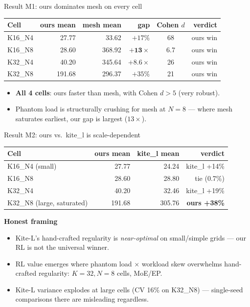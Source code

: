 \documentclass[aspectratio=169]{beamer}
\begin{document}
\begin{frame}{Result M1: ours dominates mesh on every cell}
\centering\small
\begin{tabular}{lrrrcr}
\toprule
Cell & ours mean & mesh mean & gap & Cohen $d$ & verdict \\
\midrule
K16\_N4 & 27.77  & 33.62  & $+17\%$       & 68  & ours win \\
K16\_N8 & 28.60  & 368.92 & $+\mathbf{13\times}$ & 6.7 & ours win \\
K32\_N4 & 40.20  & 345.64 & $+\mathbf{8.6\times}$ & 26  & ours win \\
K32\_N8 & 191.68 & 296.37 & $+35\%$       & 21  & ours win \\
\bottomrule
\end{tabular}

\vspace{1em}
\begin{itemize}
  \item \textbf{All 4 cells}: ours faster than mesh, with Cohen $d>5$ (very robust).
  \item Phantom load is structurally crushing for mesh at $N{=}8$
        --- where mesh saturates earliest, our gap is largest ($13\times$).
\end{itemize}
\end{frame}

\begin{frame}{Result M2: ours vs.\ kite\_l is scale-dependent}
\centering\small
\begin{tabular}{lrrr}
\toprule
Cell & ours mean & kite\_l mean & verdict \\
\midrule
K16\_N4 (small)              & 27.77  & 24.24  & \color{ourred}kite\_l +14\% \\
K16\_N8                      & 28.60  & 28.80  & tie (0.7\%) \\
K32\_N4                      & 40.20  & 32.46  & \color{ourred}kite\_l +19\% \\
K32\_N8 (large, saturated)   & 191.68 & 305.76 & \color{ourgreen}\textbf{ours +38\%} \\
\bottomrule
\end{tabular}

\vspace{1em}
\textbf{Honest framing}
\begin{itemize}
  \item Kite-L's hand-crafted regularity is \emph{near-optimal} on
        small/simple grids --- our RL is not the universal winner.
  \item \alert{RL value emerges where phantom load $\times$ workload skew
        overwhelms hand-crafted regularity}: $K{=}32, N{=}8$ cells, MoE/EP.
  \item Kite-L variance explodes at large cells (CV 16\% on K32\_N8)
        --- single-seed comparisons there are misleading regardless.
\end{itemize}
\end{frame}
\end{document}
